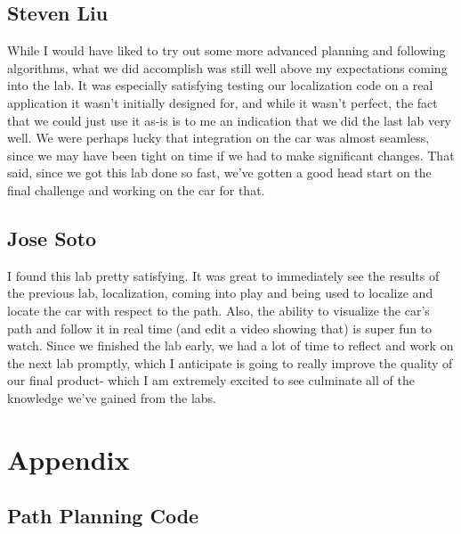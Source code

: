 \documentclass{article}
\begin{document}
\subsection{Steven Liu}

While I would have liked to try out some more advanced planning and following algorithms, what we did accomplish was still well above my expectations coming into the lab. It was especially satisfying testing our localization code on a real application it wasn't initially designed for, and while it wasn't perfect, the fact that we could just use it as-is is to me an indication that we did the last lab very well. We were perhaps lucky that integration on the car was almost seamless, since we may have been tight on time if we had to make significant changes. That said, since we got this lab done so fast, we've gotten a good head start on the final challenge and working on the car for that.

\subsection{Jose Soto}
I found this lab pretty satisfying. It was great to immediately see the results of the previous lab, localization, coming into play and being used to localize and locate the car with respect to the path. Also, the ability to visualize the car's path and follow it in real time (and edit a video showing that) is super fun to watch. Since we finished the lab early, we had a lot of time to reflect and work on the next lab promptly, which I anticipate is going to really improve the quality of our final product- which I am extremely excited to see culminate all of the knowledge we've gained from the labs.
\newpage 
\section{Appendix}
\subsection{Path Planning Code}
\end{document}
